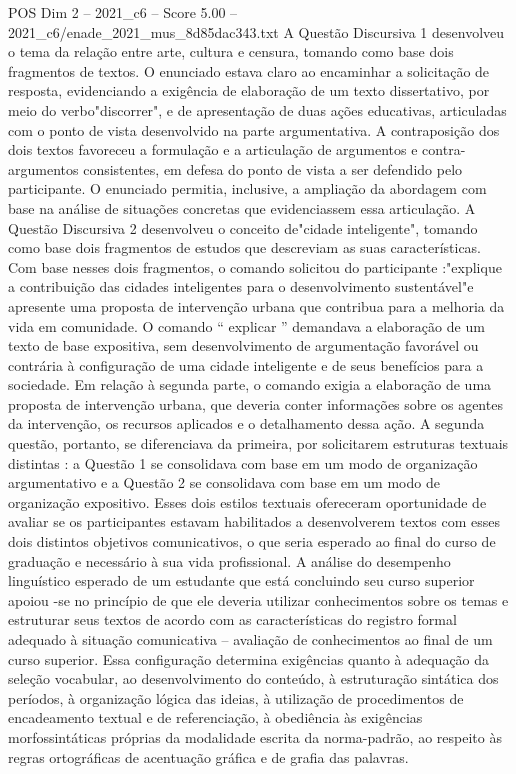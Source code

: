 \begin{textsample}{POS Dim 2 – 2021\_c6 – Score 5.00 – 2021\_c6/enade\_2021\_mus\_8d85dac343.txt}
A Questão Discursiva 1 desenvolveu o tema da relação entre arte, cultura e censura, tomando como base dois fragmentos de textos.
O enunciado estava claro ao encaminhar a solicitação de resposta, evidenciando a exigência de elaboração de um texto dissertativo, por meio do verbo"discorrer", e de apresentação de duas ações educativas, articuladas com o ponto de vista desenvolvido na parte argumentativa.
A contraposição dos dois textos favoreceu a formulação e a articulação de argumentos e contra-argumentos consistentes, em defesa do ponto de vista a ser defendido pelo participante.
O enunciado permitia, inclusive, a ampliação da abordagem com base na análise de situações concretas que evidenciassem essa articulação.
A Questão Discursiva 2 desenvolveu o conceito de"cidade inteligente", tomando como base dois fragmentos de estudos que descreviam as suas características.
Com base nesses dois fragmentos, o comando solicitou do participante :"explique a contribuição das cidades inteligentes para o desenvolvimento sustentável"e apresente uma proposta de intervenção urbana que contribua para a melhoria da vida em comunidade.
O comando “ explicar ” demandava a elaboração de um texto de base expositiva, sem desenvolvimento de argumentação favorável ou contrária à configuração de uma cidade inteligente e de seus benefícios para a sociedade.
Em relação à segunda parte, o comando exigia a elaboração de uma proposta de intervenção urbana, que deveria conter informações sobre os agentes da intervenção, os recursos aplicados e o detalhamento dessa ação.
A segunda questão, portanto, se diferenciava da primeira, por solicitarem estruturas textuais distintas : a Questão 1 se consolidava com base em um modo de organização argumentativo e a Questão 2 se consolidava com base em um modo de organização expositivo.
Esses dois estilos textuais ofereceram oportunidade de avaliar se os participantes estavam habilitados a desenvolverem textos com esses dois distintos objetivos comunicativos, o que seria esperado ao final do curso de graduação e necessário à sua vida profissional.
A análise do desempenho linguístico esperado de um estudante que está concluindo seu curso superior apoiou -se no princípio de que ele deveria utilizar conhecimentos sobre os temas e estruturar seus textos de acordo com as características do registro formal adequado à situação comunicativa – avaliação de conhecimentos ao final de um curso superior.
Essa configuração determina exigências quanto à adequação da seleção vocabular, ao desenvolvimento do conteúdo, à estruturação sintática dos períodos, à organização lógica das ideias, à utilização de procedimentos de encadeamento textual e de referenciação, à obediência às exigências morfossintáticas próprias da modalidade escrita da norma-padrão, ao respeito às regras ortográficas de acentuação gráfica e de grafia das palavras.

\end{textsample}
